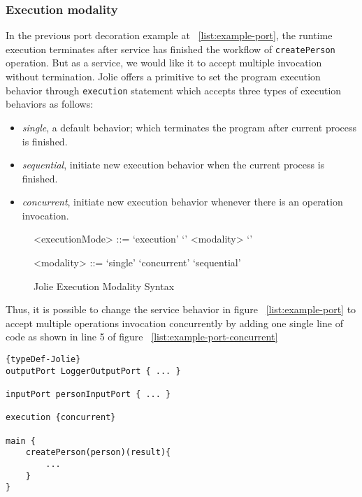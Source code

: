 \subsubsection{Execution modality}

In the previous port decoration example at ~\ref{list:example-port}, the runtime execution terminates after service has finished the workflow of \texttt{createPerson} operation. But as a service, we would like it to accept multiple invocation without termination.
Jolie offers a primitive to set the program execution behavior through \texttt{execution} statement which accepts three types of execution behaviors as follows:

\begin{itemize}
    \item \textit{single}, a default behavior; which terminates the program after current process is finished.
    \item \textit{sequential}, initiate new execution behavior when the current process is finished.
    \item \textit{concurrent}, initiate new execution behavior whenever there is an operation invocation.
\end{itemize}

\begin{figure}[ht]
    \begin{framed}
        \begin{grammar}
            <executionMode>
            ::= `execution' `{' <modality> `}'

            <modality>
            ::= `single'
            \alt `concurrent'
            \alt `sequential'
        \end{grammar}
    \end{framed}
    \caption{Jolie Execution Modality Syntax}
\end{figure}

Thus, it is possible to change the service behavior in figure ~\ref{list:example-port} to accept multiple operations invocation concurrently by adding one single line of code as shown in line 5 of figure ~\ref{list:example-port-concurrent}

\begin{listing}[ht]

    \lstset{language=Jolie,
        style=codeStyle,
        numbers=left,
        firstnumber=1
    }
    \begin{lstlisting}[frame=tlrb, caption= {Jolie concurrent service example}, label={list:example-port-concurrent} ]{typeDef-Jolie}
outputPort LoggerOutputPort { ... }

inputPort personInputPort { ... }

execution {concurrent}

main {
    createPerson(person)(result){
        ...
    }
}
\end{lstlisting}
\end{listing}

\FloatBarrier